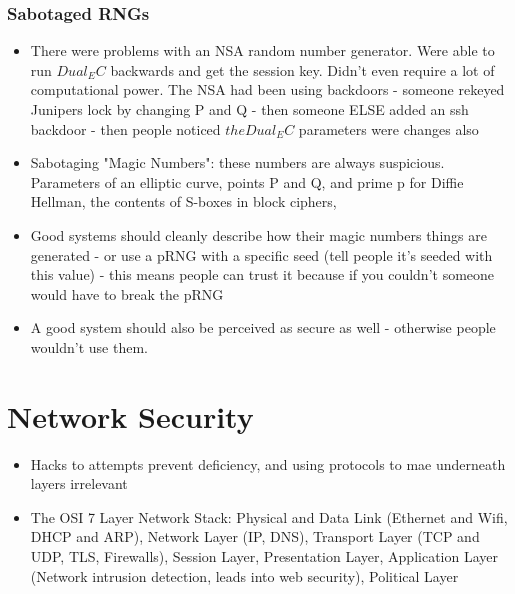 \documentclass{article}
\begin{document}
\subsubsection{Sabotaged RNGs}
\begin{itemize}
\item There were problems with an NSA random number generator. Were able to run $Dual_EC$ backwards and get the session key. Didn't even require a lot of computational power. The NSA had been using backdoors - someone rekeyed Junipers lock by changing P and Q - then someone ELSE added an ssh backdoor - then people noticed $the Dual_EC$ parameters were changes also
\item Sabotaging "Magic Numbers": these numbers are always suspicious. Parameters of an elliptic curve, points P and Q, and prime p for Diffie Hellman, the contents of S-boxes in block ciphers, 
\item Good systems should cleanly describe how their magic numbers things are generated - or use a pRNG with a specific seed (tell people it's seeded with this value) - this means people can trust it because if you couldn't someone would have to break the pRNG
\item A good system should also be perceived as secure as well - otherwise people wouldn't use them. 
\end{itemize}

\section{Network Security}
\begin{itemize}
\item Hacks to attempts prevent deficiency, and using protocols to mae underneath layers irrelevant
\item The OSI 7 Layer Network Stack: Physical and Data Link (Ethernet and Wifi, DHCP and ARP), Network Layer (IP, DNS), Transport Layer (TCP and UDP, TLS, Firewalls), Session Layer, Presentation Layer, Application Layer (Network intrusion detection, leads into web security), Political Layer
\end{itemize}
\end{document}
